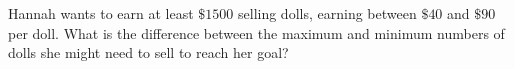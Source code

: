 Hannah wants to earn at least $\$1500$ selling dolls, earning between $\$40$ and $\$90$ per doll. What is the difference between the maximum and minimum numbers of dolls she might need to sell to reach her goal?
